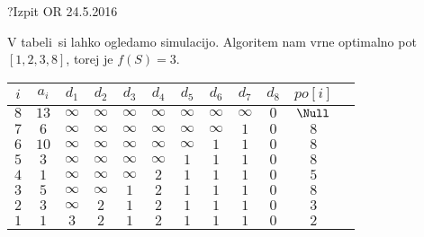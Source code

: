 \begin{naloga}{?}{Izpit OR 24.5.2016}
\begin{odgovor}
\begin{enumerate}[a)]
V tabeli~\tab si lahko ogledamo simulacijo.
Algoritem nam vrne optimalno pot $[1, 2, 3, 8]$, torej je $f(S) = 3$.

\begin{tabela}
\begin{tabular}{cc|cccccccccc}
$i$ & $a_i$ & $d_1$ & $d_2$ & $d_3$ & $d_4$ & $d_5$ & $d_6$ & $d_7$ & $d_8$ & $po[i]$\\ \hline
$8$ & $13$ & $\infty$ & $\infty$ & $\infty$ & $\infty$ & $\infty$ & $\infty$ & $\infty$ & $0$ & $\Null$\\
$7$ & $6$ & $\infty$ & $\infty$ & $\infty$ & $\infty$ & $\infty$ & $\infty$ & $1$ & $0$ & $8$\\
$6$ & $10$ & $\infty$ & $\infty$ & $\infty$ & $\infty$ & $\infty$ & $1$ & $1$ & $0$ & $8$\\
$5$ & $3$ & $\infty$ & $\infty$ & $\infty$ & $\infty$ & $1$ & $1$ & $1$ & $0$ & $8$\\
$4$ & $1$ & $\infty$ & $\infty$ & $\infty$ & $2$ & $1$ & $1$ & $1$ & $0$ & $5$\\
$3$ & $5$ & $\infty$ & $\infty$ & $1$ & $2$ & $1$ & $1$ & $1$ & $0$ & $8$\\
$2$ & $3$ & $\infty$ & $2$ & $1$ & $2$ & $1$ & $1$ & $1$ & $0$ & $3$\\
$1$ & $1$ & $3$ & $2$ & $1$ & $2$ & $1$ & $1$ & $1$ & $0$ & $2$\\
\end{tabular}
\end{tabela}


\end{enumerate}

\end{odgovor}
\end{naloga}
